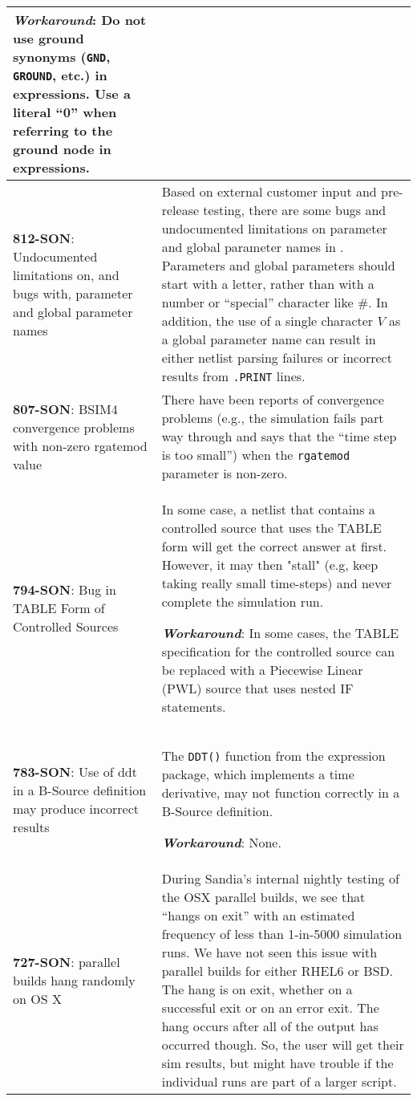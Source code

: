 {\begin{longtable}[h] {>{\raggedright\small}m{2in}|>{\raggedright\let\\\tabularnewline\small}m{3.5in}}
\textbf{\textit{Workaround}}: Do not use ground synonyms (\texttt{GND},
\texttt{GROUND}, etc.) in expressions.  Use a literal ``0'' when
referring to the ground node in expressions.\\ \hline

\textbf{812-SON}: Undocumented limitations on, and bugs with, parameter and
global parameter names & Based on external customer input and
pre-release testing, there are some bugs and undocumented limitations
on parameter and global parameter names in
\Xyce{}. Parameters and global parameters should start with a letter, rather
than with a number or ``special'' character like \#.  In addition, the
use of a single character $V$ as a global parameter name can result in
either netlist parsing failures or incorrect results
from \texttt{.PRINT} lines.  \\ \hline

\textbf{807-SON}: BSIM4 convergence problems with non-zero rgatemod value &
There have been reports of convergence problems (e.g., the \Xyce{}
simulation fails part way through and says that the ``time step is too
small'') when the \texttt{rgatemod} parameter is non-zero. \\ \hline

\textbf{794-SON}: Bug in TABLE Form of \Xyce{} Controlled Sources & In some case, a \Xyce{}
netlist that contains a controlled source that uses the TABLE form will get
the correct answer at first.  However, it may then "stall" (e.g, keep
taking really small time-steps) and never complete the simulation run.

\textbf{\textit{Workaround}}: In some cases, the TABLE specification for the controlled
source can be replaced with a Piecewise Linear (PWL) source that uses
nested IF statements. \\ \hline

\textbf{783-SON}: Use of ddt in a B-Source definition may produce incorrect
results & The \texttt{DDT()} function from the \Xyce{} expression
package, which implements a time derivative, may not function
correctly in a B-Source definition.

\textbf{\textit{Workaround}}: None. \\ \hline

\textbf{727-SON}: \Xyce{} parallel builds hang randomly on OS X & During
Sandia's internal nightly testing of the OSX parallel builds, we see
that \Xyce{} ``hangs on exit'' with an estimated frequency of less
than 1-in-5000 simulation runs.  We have not seen this issue with
parallel builds for either RHEL6 or BSD.  The hang is on exit, whether
on a successful exit or on an error exit.  The hang occurs after all
of the \Xyce{} output has occurred though.  So, the user will get
their sim results, but might have trouble if the individual \Xyce{}
runs are part of a larger script.


\end{longtable}}
